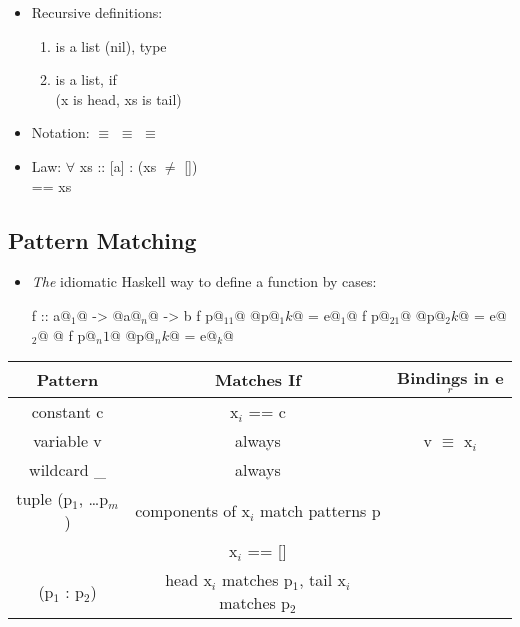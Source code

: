 \begin{itemize}
  \item Recursive definitions:
  \begin{enumerate}
      \item \codeline{[]} is a list (nil), type \codeline{[] :: [a]}
      \item {} is a list, if \\
      (x is head, xs is tail)
  \end{enumerate}
  \item Notation:  $\equiv$  $\equiv$ \codeline{[3,2,1]} $\equiv$ 
  \item Law: $\forall$ xs :: [a] :   \hspace{1cm} (xs $\neq$ []) \\
       == xs
\end{itemize}

\subsection{Pattern Matching}

\begin{itemize}
  \item \textit{The} idiomatic Haskell way to define a function by cases:\\
  \begin{Haskell}
f :: a@$_1$@ -> @\dots@ a@$_n$@ -> b
f p@$_11$@ @\dots@ p@$_1k$@ = e@$_1$@
f p@$_21$@ @\dots@ p@$_2k$@ = e@$_2$@
@\dots@
f p@$_n1$@ @\dots@ p@$_nk$@ = e@$_k$@
  \end{Haskell}

\end{itemize}
\begin{center}
\begin{tabular}{|c|c|c|}\hline
\rowcolor{grau}   
Pattern         & Matches If                & Bindings in e$_r$     \\\hline
  constant c      & x$_i$ == c                  &                     \\\hline
  variable v      & always                    & v $\equiv$ x$_i$      \\\hline
  wildcard \_      & always                    &                       \\\hline
  tuple (p$_1$, \dots p$_m$)  & components of x$_i$ match patterns p    & \\\hline
  []              & x$_i$ == []                 &                     \\\hline
  (p$_1$ : p$_2$)     & head x$_i$ matches p$_1$, tail x$_i$ matches p$_2$    & \\\hline
\end{tabular}
\end{center}

